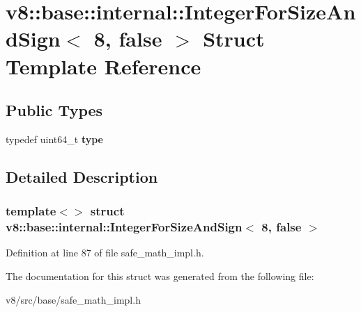 \hypertarget{structv8_1_1base_1_1internal_1_1IntegerForSizeAndSign_3_018_00_01false_01_4}{}\section{v8\+:\+:base\+:\+:internal\+:\+:Integer\+For\+Size\+And\+Sign$<$ 8, false $>$ Struct Template Reference}
\label{structv8_1_1base_1_1internal_1_1IntegerForSizeAndSign_3_018_00_01false_01_4}
\subsection*{Public Types}
\begin{DoxyCompactItemize}
\item 
\mbox{\label{structv8_1_1base_1_1internal_1_1IntegerForSizeAndSign_3_018_00_01false_01_4_a77b62b5b1b5b55212ac1b881d718e4dc}} 
typedef uint64\+\_\+t {\bfseries type}
\end{DoxyCompactItemize}


\subsection{Detailed Description}
\subsubsection*{template$<$$>$\newline
struct v8\+::base\+::internal\+::\+Integer\+For\+Size\+And\+Sign$<$ 8, false $>$}



Definition at line 87 of file safe\+\_\+math\+\_\+impl.\+h.



The documentation for this struct was generated from the following file\+:\begin{DoxyCompactItemize}
\item 
v8/src/base/safe\+\_\+math\+\_\+impl.\+h\end{DoxyCompactItemize}
